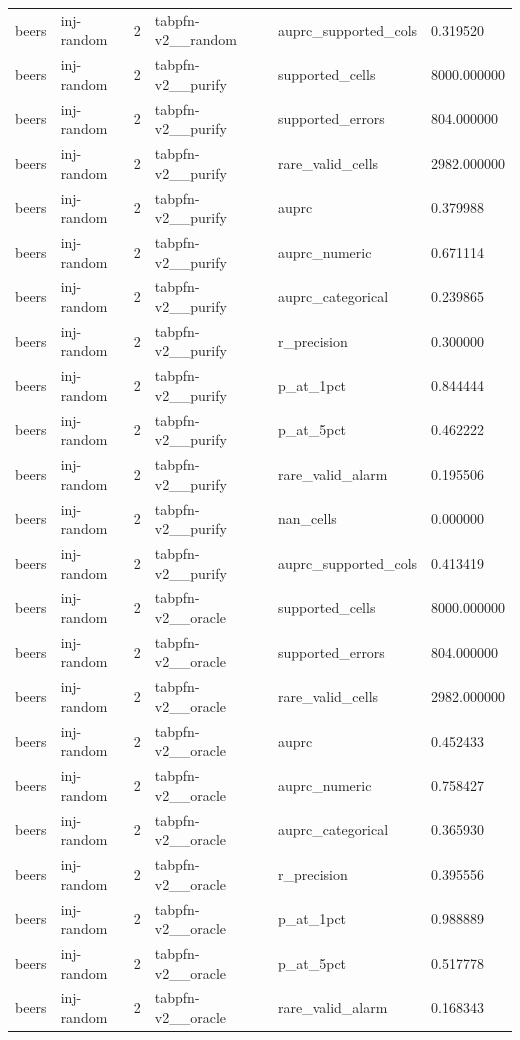 \begin{tabular}{llllll}
beers & inj-random & 2 & tabpfn-v2\_\_random & auprc\_supported\_cols & 0.319520 \\
beers & inj-random & 2 & tabpfn-v2\_\_purify & supported\_cells & 8000.000000 \\
beers & inj-random & 2 & tabpfn-v2\_\_purify & supported\_errors & 804.000000 \\
beers & inj-random & 2 & tabpfn-v2\_\_purify & rare\_valid\_cells & 2982.000000 \\
beers & inj-random & 2 & tabpfn-v2\_\_purify & auprc & 0.379988 \\
beers & inj-random & 2 & tabpfn-v2\_\_purify & auprc\_numeric & 0.671114 \\
beers & inj-random & 2 & tabpfn-v2\_\_purify & auprc\_categorical & 0.239865 \\
beers & inj-random & 2 & tabpfn-v2\_\_purify & r\_precision & 0.300000 \\
beers & inj-random & 2 & tabpfn-v2\_\_purify & p\_at\_1pct & 0.844444 \\
beers & inj-random & 2 & tabpfn-v2\_\_purify & p\_at\_5pct & 0.462222 \\
beers & inj-random & 2 & tabpfn-v2\_\_purify & rare\_valid\_alarm & 0.195506 \\
beers & inj-random & 2 & tabpfn-v2\_\_purify & nan\_cells & 0.000000 \\
beers & inj-random & 2 & tabpfn-v2\_\_purify & auprc\_supported\_cols & 0.413419 \\
beers & inj-random & 2 & tabpfn-v2\_\_oracle & supported\_cells & 8000.000000 \\
beers & inj-random & 2 & tabpfn-v2\_\_oracle & supported\_errors & 804.000000 \\
beers & inj-random & 2 & tabpfn-v2\_\_oracle & rare\_valid\_cells & 2982.000000 \\
beers & inj-random & 2 & tabpfn-v2\_\_oracle & auprc & 0.452433 \\
beers & inj-random & 2 & tabpfn-v2\_\_oracle & auprc\_numeric & 0.758427 \\
beers & inj-random & 2 & tabpfn-v2\_\_oracle & auprc\_categorical & 0.365930 \\
beers & inj-random & 2 & tabpfn-v2\_\_oracle & r\_precision & 0.395556 \\
beers & inj-random & 2 & tabpfn-v2\_\_oracle & p\_at\_1pct & 0.988889 \\
beers & inj-random & 2 & tabpfn-v2\_\_oracle & p\_at\_5pct & 0.517778 \\
beers & inj-random & 2 & tabpfn-v2\_\_oracle & rare\_valid\_alarm & 0.168343 \\

\end{tabular}
